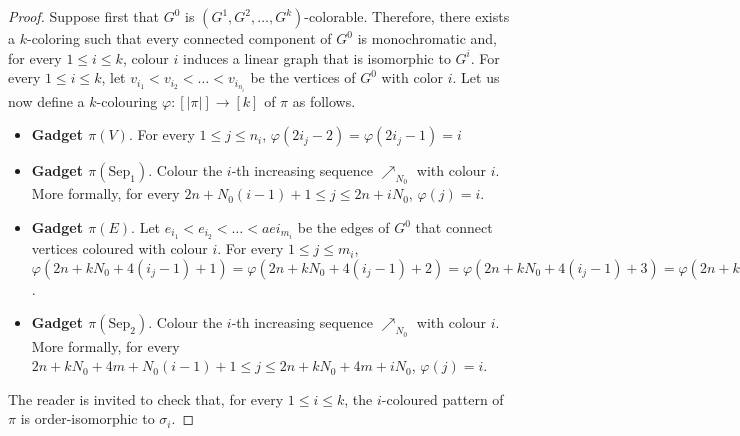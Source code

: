 \begin{proof}
  Suppose first that $G^0$ is $(G^1, G^2, \dots, G^k)$-colorable.
  Therefore, there exists a $k$-coloring such that
  every connected component of $G^0$ is monochromatic and,
  for every $1 \leq i \leq k$, colour $i$ induces a linear graph that is
  isomorphic to $G^i$.
  For every $1 \leq i \leq k$,
  let $v_{i_1}< v_{i_2} < \dots < v_{i_{n_i}}$ be the vertices of $G^0$ with color $i$.
  Let us now define a $k$-colouring $\varphi: [|\pi|] \to [k]$ of $\pi$ as follows.
  \begin{itemize}
    \item \textbf{Gadget $\pi(V)$}.
    For every $1 \leq j \leq n_i$,
    $\varphi(2i_j-2) = \varphi(2i_j-1) = i$
    \item \textbf{Gadget $\pi(\text{Sep}_1)$}.
    Colour the $i$-th increasing sequence $\nearrow_{N_0}$ with colour $i$.
    More formally,
    for every $2n + N_0(i-1) + 1 \leq j \leq 2n + iN_0$,
    $\varphi(j) = i$.
    \item \textbf{Gadget $\pi(E)$}.
    Let $e_{i_1} < e_{i_2} < \ldots < ae{i_{m_i}}$ be the edges of $G^0$ that connect
    vertices coloured with colour $i$.
    For every $1 \leq j \leq m_i$,
    $\varphi(2n + kN_0 + 4(i_j-1) + 1) = \varphi(2n + kN_0 + 4(i_j-1) + 2) =
    \varphi(2n + kN_0 + 4(i_j-1) + 3) = \varphi(2n + kN_0 + 4(i_j-1) + 4) = i$.
    \item \textbf{Gadget $\pi(\text{Sep}_2)$}.
    Colour the $i$-th increasing sequence $\nearrow_{N_0}$ with colour $i$.
    More formally,
    for every $2n + kN_0 + 4m + N_0(i-1) + 1 \leq j \leq 2n + kN_0 + 4m + iN_0$,
    $\varphi(j) = i$.
  \end{itemize}
  The reader is invited to check that, for every $1 \leq i \leq k$,
  the $i$-coloured pattern of $\pi$ is order-isomorphic to $\sigma_i$.


\end{proof}
